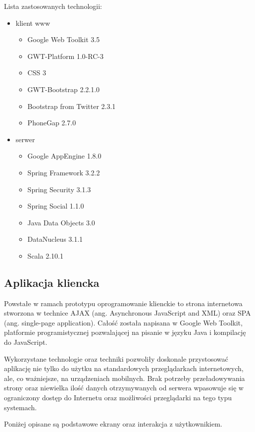 Lista zastosowanych technologii:
\begin{itemize}
  
  \item klient www
  \begin{itemize}
    \item Google Web Toolkit 3.5
    \item GWT-Platform 1.0-RC-3
    \item CSS 3
    \item GWT-Bootstrap 2.2.1.0
    \item Bootstrap from Twitter 2.3.1
    \item PhoneGap 2.7.0
  \end{itemize}
  
  \item serwer
  \begin{itemize}
    \item Google AppEngine 1.8.0
    \item Spring Framework 3.2.2
    \item Spring Security 3.1.3
    \item Spring Social 1.1.0
    \item Java Data Objects 3.0
    \item DataNucleus 3.1.1
    \item Scala 2.10.1
  \end{itemize}
\end{itemize}

\subsection{Aplikacja kliencka}
Powstałe w ramach prototypu oprogramowanie klienckie to strona internetowa
stworzona w technice AJAX (ang. Asynchronous JavaScript and XML) oraz SPA (ang.
single-page application). Całość została napisana w Google Web Toolkit,
platformie programistycznej pozwalającej na pisanie w języku Java i kompilację
do JavaScript. 

Wykorzystane technologie oraz techniki pozwoliły doskonale przystosować
aplikację nie tylko do użytku na standardowych przeglądarkach internetowych,
ale, co ważniejsze, na urządzeniach mobilnych. Brak potrzeby przeładowywania
strony oraz niewielka ilość danych otrzymywanych od serwera wpasowuje się w
ograniczony dostęp do Internetu oraz możliwości przeglądarki na tego typu
systemach.

Poniżej opisane są podstawowe ekrany oraz interakcja z użytkownikiem.

